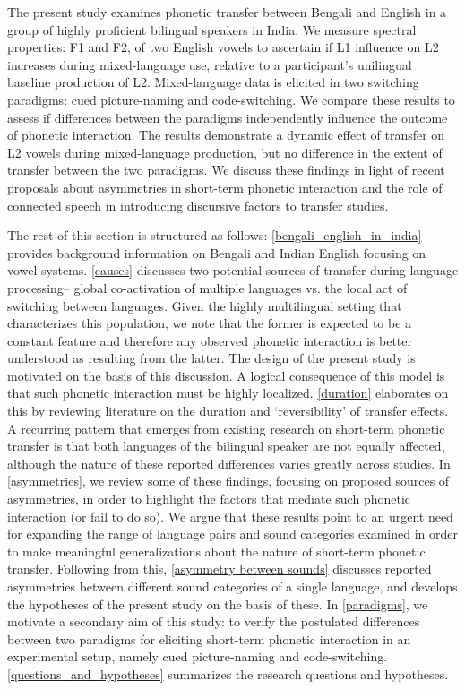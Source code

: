 \documentclass[12 pt]{article}
\begin{document}
The present study examines phonetic transfer between Bengali and English in a group of highly proficient bilingual speakers in India. We measure spectral properties: F1 and F2, of two English vowels to ascertain if L1 influence on L2 increases during mixed-language use, relative to a participant's unilingual baseline production of L2. Mixed-language data is elicited in two switching paradigms: cued picture-naming and code-switching. We compare these results to assess if differences between the paradigms independently influence the outcome of phonetic interaction. The results demonstrate a dynamic effect of transfer on L2 vowels during mixed-language production, but no difference in the extent of transfer between the two paradigms. We discuss these findings in light of recent proposals about asymmetries in short-term phonetic interaction and the role of connected speech in introducing discursive factors to transfer studies.


The rest of this section is structured as follows: \ref{bengali_english_in_india} provides background information on Bengali and Indian English focusing on vowel systems. \ref{causes} discusses two potential sources of transfer during language processing-- global co-activation of multiple languages vs. the local act of switching between languages. Given the highly multilingual setting that characterizes this population, we note that the former is expected to be a constant feature and therefore any observed phonetic interaction is better understood as resulting from the latter. The design of the present study is motivated on the basis of this discussion. A logical consequence of this model is that such phonetic interaction must be highly localized. \ref{duration} elaborates on this by reviewing literature on the duration and `reversibility' of transfer effects. A recurring pattern that emerges from existing research on short-term phonetic transfer is that both languages of the bilingual speaker are not equally affected, although the nature of these reported differences varies greatly across studies. In \ref{asymmetries}, we review some of these findings, focusing on proposed sources of asymmetries, in order to highlight the factors that mediate such phonetic interaction (or fail to do so). We argue that these results point to an urgent need for expanding the range of language pairs and sound categories examined in order to make meaningful generalizations about the nature of short-term phonetic transfer. Following from this, \ref{asymmetry between sounds} discusses reported asymmetries between different sound categories of a single language, and develops the hypotheses of the present study on the basis of these. In \ref{paradigms}, we motivate a secondary aim of this study: to verify the postulated differences between two paradigms for eliciting short-term phonetic interaction in an experimental setup, namely cued picture-naming and code-switching. \ref{questions_and_hypotheses} summarizes the research questions and hypotheses.
\end{document}
